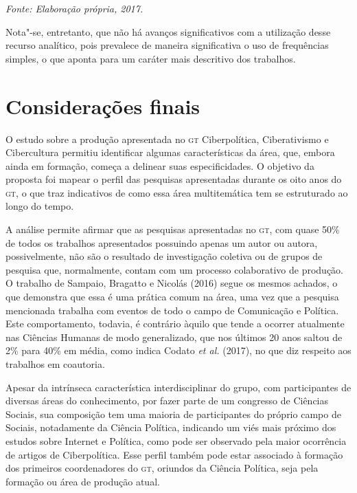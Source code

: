 \begin{center}
{\footnotesize\emph{Fonte: Elaboração própria, 2017.}}
\end{center}

Nota"-se, entretanto, que não há avanços significativos com a utilização
desse recurso analítico, pois prevalece de maneira significativa o uso
de frequências simples, o que aponta para um caráter mais descritivo dos
trabalhos.

\section{Considerações finais}

O estudo sobre a produção apresentada no \textsc{gt} Ciberpolítica, Ciberativismo
e Cibercultura permitiu identificar algumas características da área,
que, embora ainda em formação, começa a delinear suas especificidades. O
objetivo da proposta foi mapear o perfil das pesquisas apresentadas
durante os oito anos do \textsc{gt}, o que traz indicativos de como essa área
multitemática tem se estruturado ao longo do tempo.

A análise permite afirmar que as pesquisas apresentadas no \textsc{gt}, com quase
50\% de todos os trabalhos apresentados possuindo apenas um autor ou
autora, possivelmente, não são o resultado de investigação coletiva ou
de grupos de pesquisa que, normalmente, contam com um processo
colaborativo de produção. O trabalho de Sampaio, Bragatto e Nicolás
(2016) segue os mesmos achados, o que demonstra que essa é uma prática
comum na área, uma vez que a pesquisa mencionada trabalha com eventos de
todo o campo de Comunicação e Política. Este comportamento, todavia, é
contrário àquilo que tende a ocorrer atualmente nas Ciências Humanas de
modo generalizado, que nos últimos 20 anos saltou de 2\% para 40\% em
média, como indica Codato \emph{et al.} (2017), no que diz respeito aos
trabalhos em coautoria.

Apesar da intrínseca característica interdisciplinar do grupo, com
participantes de diversas áreas do conhecimento, por fazer parte de um
congresso de Ciências Sociais, sua composição tem uma maioria de
participantes do próprio campo de Sociais, notadamente da Ciência
Política, indicando um viés mais próximo dos estudos sobre Internet e
Política, como pode ser observado pela maior ocorrência de artigos de
Ciberpolítica. Esse perfil também pode estar associado à formação dos
primeiros coordenadores do \textsc{gt}, oriundos da Ciência Política, seja pela
formação ou área de produção atual.

